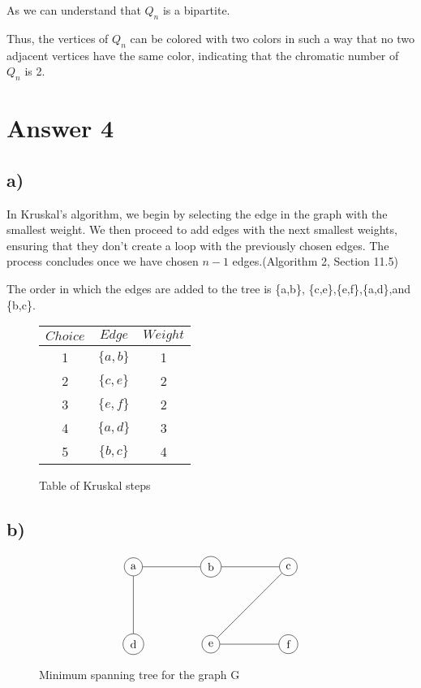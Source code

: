 \documentclass[12pt]{article}
\begin{document}
As we can understand that \( Q_n \) is a bipartite.

Thus, the vertices of \( Q_n \) can be colored with two colors in such a way that no two adjacent vertices have the same color, indicating that the chromatic number of \( Q_n \) is 2.


\section*{Answer 4}

\subsection*{a)}

In Kruskal's algorithm, we begin by selecting the edge in the graph with the smallest weight. We then proceed to add edges with the next smallest weights, ensuring that they don't create a loop with the previously chosen edges. The process concludes once we have chosen \( n - 1 \) edges.(Algorithm 2, Section 11.5)

The order in which the edges are added to the tree is \{a,b\}, \{c,e\},\{e,f\},\{a,d\},and \{b,c\}.

\begin{figure}[H] 

\begin{table}[H]
	\small
	\centering
	\begin{tabular}{|c|c|c|}	
	\hline
	$Choice$ & $Edge$ & $Weight$\\
	\hline 
	1 & $\{a,b\}$ & 1\\			
	2 & $\{c,e\}$ & 2\\	
	3 & $\{e,f\}$ & 2\\	
	4 & $\{a,d\}$ & 3\\	
	5 & $\{b,c\}$ & 4 \\	
	\hline 
	\end{tabular}
\end{table}

\caption{Table of Kruskal steps}
\end{figure}

\subsection*{b)}

\begin{figure}[H] 
    \[
\begin{tikzpicture}[scale=0.8]
    \node[circle,draw,] (a) at (-3,0) {a};
    \node[circle,draw,] (b) at (0,0) {b};
    \node[circle,draw,] (c) at (3,0) {c};
    \node[circle,draw,] (d) at (-3,-3) {d};
    \node[circle,draw,](e) at (0,-3) {e};
    \node[circle,draw,] (f) at (3,-3) {f};
    
    \draw (a) -- (b);
    \draw (c) -- (e);
    \draw (e) -- (f);
    \draw (a) -- (d);
    \draw (b) -- (c);
    
\end{tikzpicture}
\]
\caption{Minimum spanning tree for the graph G}
\end{figure}
\end{document}
